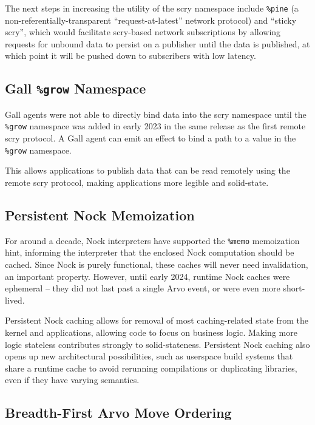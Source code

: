 \documentclass[twoside]{article}
\begin{document}
\sloppy
The next steps in increasing the utility of the scry namespace include \lstinline[style=inlinecode]{%pine} (a non-referentially-transparent ``request-at-latest'' network protocol) and ``sticky scry'', which would facilitate scry-based network subscriptions by allowing requests for unbound data to persist on a publisher until the data is published, at which point it will be pushed down to subscribers with low latency.

\subsection{Gall \texttt{\%grow} Namespace}

Gall agents were not able to directly bind data into the scry namespace until the \lstinline[style=inlinecode]{%grow} namespace was added in early 2023 in the same release as the first remote scry protocol.  A Gall agent can emit an effect to bind a path  to a value in the \lstinline[style=inlinecode]{%grow} namespace.  

This allows applications to publish data that can be read remotely using the remote scry protocol, making applications more legible and solid-state.

\subsection{Persistent Nock Memoization}

For around a decade, Nock interpreters have supported the \lstinline[style=inlinecode]{%memo} memoization hint, informing the interpreter that the enclosed Nock computation should be cached.  Since Nock is purely functional, these caches will never need invalidation, an important property.  However, until early 2024, runtime Nock caches were ephemeral – they did not last past a single Arvo event, or were even more short-lived.

Persistent Nock caching allows for removal of most caching-related state from the kernel and applications, allowing code to focus on business logic.  Making more logic stateless contributes strongly to solid-stateness.  Persistent Nock caching also opens up new architectural possibilities, such as userspace build systems that share a runtime cache to avoid rerunning compilations or duplicating libraries, even if they have varying semantics.

\subsection{Breadth-First Arvo Move Ordering}
\end{document}
